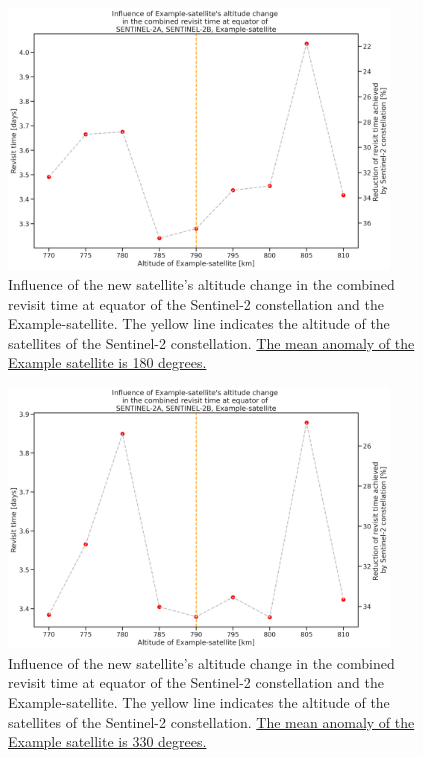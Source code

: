 \begin{figure}
\centering
\includegraphics[width=0.9\textwidth]{Images/revisit_time_ofdoubleaxisaltitude_SENTINEL-2A_SENTINEL-2B_Example-satellite_180deg.png}
\caption{Influence of the new satellite's altitude change in the combined revisit time at equator of the Sentinel-2 constellation and the Example-satellite. The yellow line indicates the altitude of the satellites of the Sentinel-2 constellation. \underline{The mean anomaly of the Example satellite is 180 degrees.}}
\label{revisit_time_ofdoubleaxisaltitude_SENTINEL-2A_SENTINEL-2B_Example-satellite_180deg}
\end{figure}

\begin{figure}
\centering
\includegraphics[width=0.9\textwidth]{Images/revisit_time_ofdoubleaxisaltitude_SENTINEL-2A_SENTINEL-2B_Example-satellite_330deg.png}
\caption{Influence of the new satellite's altitude change in the combined revisit time at equator of the Sentinel-2 constellation and the Example-satellite. The yellow line indicates the altitude of the satellites of the Sentinel-2 constellation. \underline{The mean anomaly of the Example satellite is 330 degrees.}}
\label{revisit_time_ofdoubleaxisaltitude_SENTINEL-2A_SENTINEL-2B_Example-satellite_330deg}
\end{figure}

